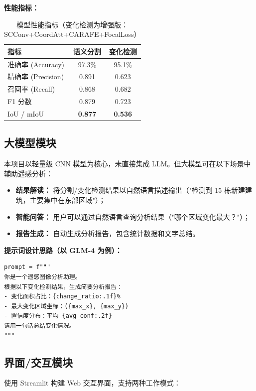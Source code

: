 \documentclass[12pt,a4paper]{article}
\begin{document}
\textbf{性能指标：}

\begin{table}[H]
\centering
\caption{模型性能指标（变化检测为增强版：SCConv+CoordAtt+CARAFE+FocalLoss）}
\label{tab:perf}
\begin{tabular}{lcc}
\toprule
指标 & 语义分割 & 变化检测 \\
\midrule
准确率 (Accuracy) & 97.3\% & 95.1\% \\
精确率 (Precision) & 0.891 & 0.623 \\
召回率 (Recall) & 0.868 & 0.682 \\
F1 分数 & 0.879 & 0.723 \\
IoU / mIoU & \textbf{0.877} & \textbf{0.536} \\
\bottomrule
\end{tabular}
\end{table}

\subsection{大模型模块}

本项目以轻量级 CNN 模型为核心，未直接集成 LLM。但大模型可在以下场景中辅助遥感分析：

\begin{itemize}
    \item \textbf{结果解读：} 将分割/变化检测结果以自然语言描述输出（"检测到 15 栋新建建筑，主要集中在东部区域"）；
    \item \textbf{智能问答：} 用户可以通过自然语言查询分析结果（"哪个区域变化最大？"）；
    \item \textbf{报告生成：} 自动生成分析报告，包含统计数据和文字总结。
\end{itemize}

\textbf{提示词设计思路（以 GLM-4 为例）：}

\begin{lstlisting}
prompt = f"""
你是一个遥感图像分析助理。
根据以下变化检测结果，生成简要分析报告：
- 变化面积占比：{change_ratio:.1f}%
- 最大变化区域坐标：({max_x}, {max_y})
- 置信度分布：平均 {avg_conf:.2f}
请用一句话总结变化情况。
"""
\end{lstlisting}

\subsection{界面/交互模块}

使用 Streamlit 构建 Web 交互界面，支持两种工作模式：
\end{document}
